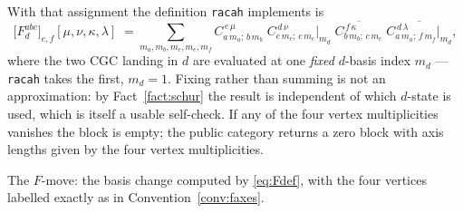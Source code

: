 \documentclass[11pt,a4paper]{article}
\theoremstyle{plain}
\theoremstyle{definition}
\newcommand{\fvert}[2]{\node[fvertex] at (#1) {};%
  \node[fleg, right=1pt] at (#1) {$#2$};}
\newcommand{\code}[1]{\texttt{#1}}
\begin{document}
With that assignment the definition \code{racah} implements is
\begin{equation}\label{eq:Fdef}
  \bigl[F^{abc}_{d}\bigr]_{e,f}[\mu,\nu,\kappa,\lambda]
  \;=\!\!\sum_{m_a,m_b,m_c,m_e,m_f}\!\!
    C^{\,e\,\mu}_{a\,m_a;\,b\,m_b}\;
    C^{\,d\,\nu}_{e\,m_e;\,c\,m_c}\Big|_{m_d}\;
    \overline{C^{\,f\,\kappa}_{b\,m_b;\,c\,m_c}}\;
    \overline{C^{\,d\,\lambda}_{a\,m_a;\,f\,m_f}\Big|_{m_d}} ,
\end{equation}
where the two CGC landing in $d$ are evaluated at one \emph{fixed} $d$-basis
index $m_d$ --- \code{racah} takes the first, $m_d=1$. Fixing rather than
summing is not an approximation: by Fact~\ref{fact:schur} the result is
independent of which $d$-state is used, which is itself a usable self-check.
If any of the four vertex multiplicities vanishes the block is empty; the
public category returns a zero block with axis lengths given by the four
vertex multiplicities.

\begin{center}

\smallskip
{\small The $F$-move: the basis change computed by \eqref{eq:Fdef}, with the
four vertices labelled exactly as in Convention~\ref{conv:faxes}.}
\end{center}
\end{document}
